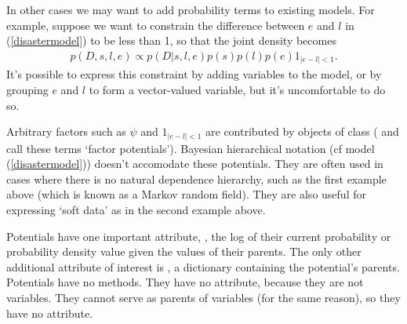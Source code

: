 In other cases we may want to add probability terms to existing models. For example, suppose we want to constrain the difference between $e$ and $l$ in (\ref{disastermodel}) to be less than 1, so that the joint density becomes
\begin{eqnarray*}
    p(D,s,l,e) \propto p(D|s,l,e) p(s) p(l) p(e) 1_{|e-l|<1}.
\end{eqnarray*}
It's possible to express this constraint by adding variables to the model, or by grouping $e$ and $l$ to form a vector-valued variable, but it's uncomfortable to do so.

Arbitrary factors such as $\psi$ and $1_{|e-l|<1}$ are contributed by objects of class  (\cite{dawidmarkov} and \cite{Jordan:2004p5439} call these terms `factor potentials'). Bayesian hierarchical notation (cf model (\ref{disastermodel})) doesn't accomodate these potentials. They are often used in cases where there is no natural dependence hierarchy, such as the first example above (which is known as a Markov random field). They are also useful for expressing `soft data' \citep{Christakos:2002p5506} as in the second example above.


\bigskip
Potentials have one important attribute, , the log of their current probability or probability density value given the values of their parents. The only other additional attribute of interest is , a dictionary containing the potential's parents. Potentials have no methods. They have no  attribute, because they are not variables. They cannot serve as parents of variables (for the same reason), so they have no  attribute.

